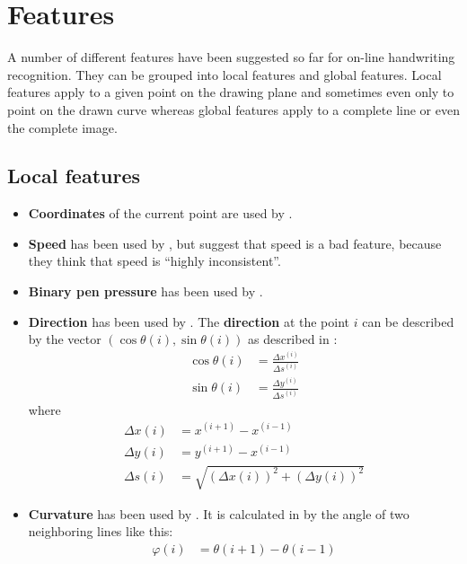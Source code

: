 \section{Features}\label{sec:features}
A number of different features have been suggested so far for on-line handwriting
recognition. They can be grouped into local features and global features.
Local features apply to a given point on the drawing plane and sometimes even
only to point on the drawn curve whereas global features apply to a complete
line or even the complete image.

\subsection{Local features}
\begin{itemize}
    \item \textbf{Coordinates} of the current point are used by \cite{Guyon91}.
    \item \textbf{Speed} has been used by \cite{ICASSP-94}, but
          \cite{Kosmala98,Kosmala11} suggest that speed is a bad feature,
          because they think that speed is \enquote{highly inconsistent}.
    \item \textbf{Binary pen pressure} has been used by \cite{Kosmala98,Kosmala11,ICASSP-94,Manke94,Guyon91}.
    \item \textbf{Direction} has been used by \cite{Manke95,Huang06}.
The \textbf{direction} at the point $i$ can be described by the vector 
$(\cos \theta(i), \sin \theta(i))$ as described in \cite{Guyon91}:
\begin{align}
    \cos \theta(i) &= \frac{\Delta x^{(i)}}{\Delta s^{(i)}}\\
    \sin \theta(i) &= \frac{\Delta y^{(i)}}{\Delta s^{(i)}}
\end{align}
where
\begin{align}
    \Delta x (i) &= x^{(i+1)} - x^{(i-1)}\\
    \Delta y (i) &= y^{(i+1)} - x^{(i-1)}\\
    \Delta s (i) &= \sqrt{(\Delta x(i))^2 + (\Delta y (i))^2}
\end{align}
    \item \textbf{Curvature} has been used by \cite{Groner66,Manke95,ICASSP-94,Guyon91}.
          It is calculated in \cite{Guyon91} by the angle of two neighboring
          lines like this:
          \begin{align}
              \varphi(i)      &= \theta(i+1) - \theta(i-1)\\

\end{align}
\end{itemize}
